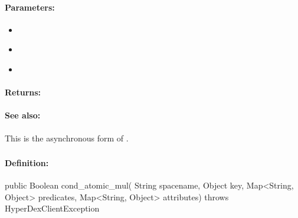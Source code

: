 \paragraph{Parameters:}
\begin{itemize}[noitemsep]
\item {}\\

\item {}\\

\item {}\\

\end{itemize}

\paragraph{Returns:}


\paragraph{See also:}  This is the asynchronous form of .

\pagebreak
\subsubsection{}
\label{api:java:cond_atomic_mul}


\paragraph{Definition:}
\begin{javacode}
public Boolean cond_atomic_mul(
        String spacename,
        Object key,
        Map<String, Object> predicates,
        Map<String, Object> attributes) throws HyperDexClientException
\end{javacode}

